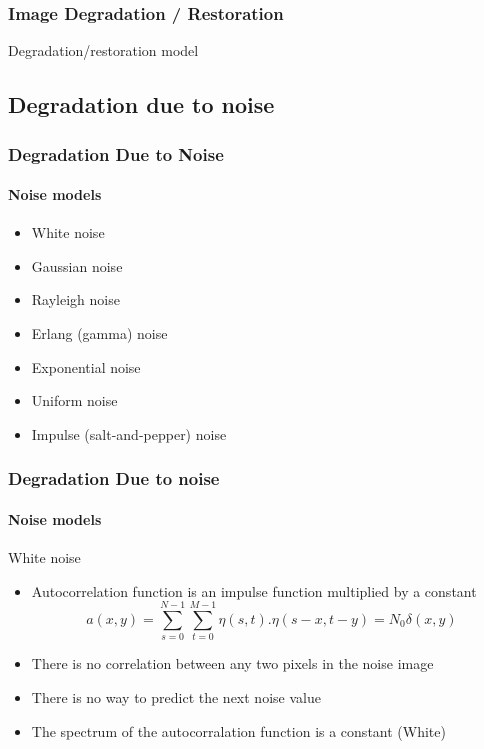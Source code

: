 \documentclass{beamer}
\begin{document}
\begin{frame}
\frametitle{Image Degradation / Restoration}
\begin{block}{Degradation/restoration model}
\end{block}
\end{frame}
\subsection{Degradation due to noise}
\begin{frame}
\frametitle{Degradation Due to Noise}
\framesubtitle{Noise models}
\begin{itemize}
	\item White noise
	\item Gaussian noise 
	\item Rayleigh noise 
	\item Erlang (gamma) noise 
	\item Exponential noise 
	\item Uniform noise 
	\item Impulse (salt-and-pepper) noise 
\end{itemize}
\end{frame}
\begin{frame}	
\frametitle{Degradation Due to noise}
\framesubtitle{Noise models}
\begin{block}{White noise}
\begin{itemize}
	\item Autocorrelation function is an impulse function multiplied by a constant
	$$a(x,y) = \sum^{N-1}_{s=0}\sum^{M-1}_{t=0} \eta(s,t).\eta(s-x,t-y) = N_{0}\delta(x,y)$$
	\item There is no correlation between any two pixels in the noise image
	\item There is no way to predict the next noise value 
	\item The spectrum of the autocorralation function is a constant (White) 
\end{itemize}		
\end{block}
\end{frame}
\end{document}
